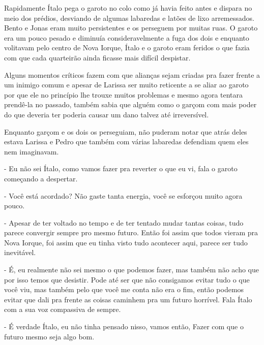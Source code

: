 Rapidamente Ítalo pega o garoto no colo como já havia feito antes e dispara no meio dos prédios, desviando de algumas labaredas e latões de lixo arremessados. Bento e Jonas eram muito persistentes e os perseguem por muitas ruas. O garoto era um pouco pesado e diminuía consideravelmente a fuga dos dois e enquanto volitavam pelo centro de Nova Iorque, Ítalo e o garoto eram feridos o que fazia com que cada quarteirão ainda ficasse mais difícil despistar.

Alguns momentos críticos fazem com que alianças sejam criadas pra fazer frente a um inimigo comum e apesar de Larissa ser muito reticente a se aliar ao garoto por que ele no princípio lhe trouxe muitos problemas e mesmo agora tentara prendê-la no passado, também sabia que alguém como o garçom com mais poder do que deveria ter poderia causar um dano talvez até irreversível.

Enquanto garçom e os dois os perseguiam, não puderam notar que atrás deles estava Larissa e Pedro que também com várias labaredas defendiam quem eles nem imaginavam. 

- Eu não sei Ítalo, como vamos fazer pra reverter o que eu vi, fala o garoto começando a despertar.

- Você está acordado? Não gaste tanta energia, você se esforçou muito agora pouco.

- Apesar de ter voltado no tempo e de ter tentado mudar tantas coisas, tudo parece convergir sempre pro mesmo futuro. Então foi assim que todos vieram pra Nova Iorque, foi assim que eu tinha visto tudo acontecer aqui, parece ser tudo inevitável.

- É, eu realmente não sei mesmo o que podemos fazer, mas também não acho que por isso temos que desistir. Pode até ser que não consigamos evitar tudo o que você viu, mas também pelo que você me conta não era o fim, então podemos evitar que dali pra frente as coisas caminhem pra um futuro horrível. Fala Ítalo com a sua voz compassiva de sempre.

- É verdade Ítalo, eu não tinha pensado nisso, vamos então, Fazer com que o futuro mesmo seja algo bom.


